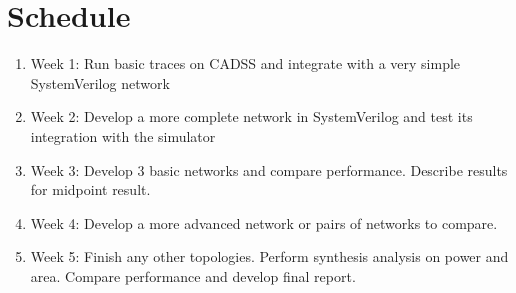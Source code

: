 \documentclass{article}
\begin{document}
\section{Schedule}

\begin{enumerate}
    \item Week 1: Run basic traces on CADSS and integrate with a very simple SystemVerilog network
    \item Week 2: Develop a more complete network in SystemVerilog and test its integration with the simulator
    \item Week 3: Develop 3 basic networks and compare performance. Describe results for midpoint result.
    \item Week 4: Develop a more advanced network or pairs of networks to compare. 
    \item Week 5: Finish any other topologies. Perform synthesis analysis on power and area. Compare performance and develop final report. 
\end{enumerate}
\end{document}
